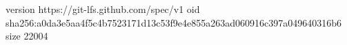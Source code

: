 version https://git-lfs.github.com/spec/v1
oid sha256:a0da3e5aa4f5c4b7523171d13c53f9e4e855a263ad060916c397a049640316b6
size 22004
